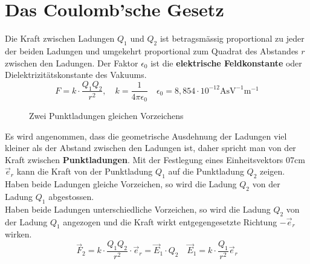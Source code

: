 \section{Das Coulomb'sche Gesetz}
Die Kraft zwischen Ladungen $Q_1$ und $Q_2$ ist betragsmässig proportional zu jeder der beiden Ladungen und umgekehrt proportional zum Quadrat des Abstandes $r$ zwischen den Ladungen. Der Faktor $\epsilon_0$ ist die \textbf{elektrische Feldkonstante} oder Dielektrizitätskonstante des Vakuums.
\begin{equation}
\boxed{F=k\cdot \dfrac{Q_1Q_2}{r^2},\quad k=\dfrac{1}{4\pi\epsilon_0}}\quad \boxed{\epsilon_0=8,854\cdot 10^{-12}\text{AsV}^{-1}\text{m}^{-1}}
\end{equation}
\begin{figure}[H]
\centering
\caption{Zwei Punktladungen gleichen Vorzeichens}
\label{fig_Ib}
\end{figure}
\noindent Es wird angenommen, dass die geometrische Ausdehnung der Ladungen viel kleiner als der Abstand zwischen den Ladungen ist, daher spricht man von der Kraft zwischen \textbf{Punktladungen}. Mit der Festlegung eines Einheitsvektors {0}{7cm}$\overrightarrow{e}_r$ kann die Kraft von der Punktladung $Q_1$ auf die Punktladung $Q_2$ zeigen. Haben beide Ladungen gleiche Vorzeichen, so wird die Ladung $Q_2$ von der Ladung $Q_1$ abgestossen. \\Haben beide Ladungen unterschiedliche Vorzeichen, so wird die Ladung $Q_2$ von der Ladung $Q_1$ angezogen und die Kraft wirkt entgegengesetzte Richtung $-\overrightarrow{e}_r$ wirken.
\begin{equation}
\boxed{\overrightarrow{F}_2=k\cdot \dfrac{Q_1Q_2}{r^2}\cdot \overrightarrow{e}_r=\overrightarrow{E}_1\cdot Q_2}\quad \boxed{\overrightarrow{E}_1=k\cdot \dfrac{Q_1}{r^2}\overrightarrow{e}_r}
\end{equation}
